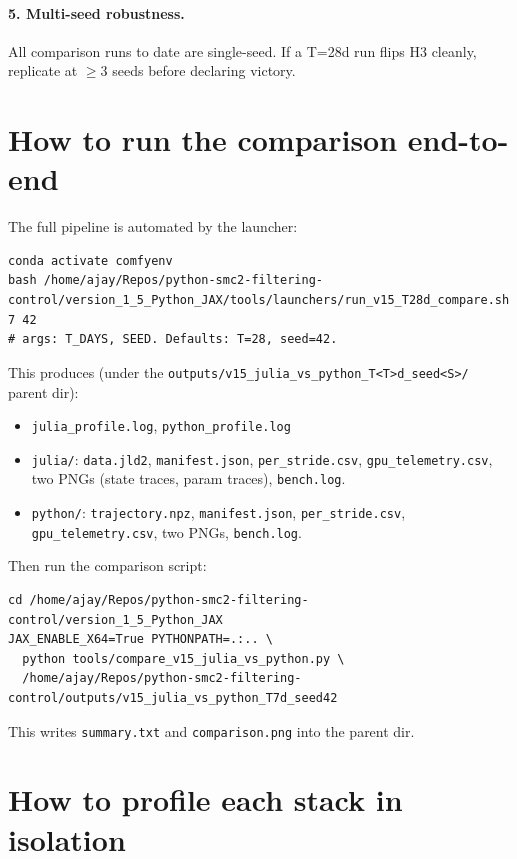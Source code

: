 \documentclass[11pt,a4paper]{article}
\begin{document}
\paragraph{5. Multi-seed robustness.}
All comparison runs to date are single-seed. If a T=28d run flips
H3 cleanly, replicate at $\geq 3$ seeds before declaring victory.

\section{How to run the comparison end-to-end}

The full pipeline is automated by the launcher:

\begin{lstlisting}
conda activate comfyenv
bash /home/ajay/Repos/python-smc2-filtering-control/version_1_5_Python_JAX/tools/launchers/run_v15_T28d_compare.sh 7 42
# args: T_DAYS, SEED. Defaults: T=28, seed=42.
\end{lstlisting}

This produces (under the \texttt{outputs/v15\_julia\_vs\_python\_T<T>d\_seed<S>/}
parent dir):

\begin{itemize}[itemsep=2pt]
  \item \texttt{julia\_profile.log}, \texttt{python\_profile.log}
  \item \texttt{julia/}: \texttt{data.jld2},
        \texttt{manifest.json}, \texttt{per\_stride.csv},
        \texttt{gpu\_telemetry.csv}, two PNGs (state traces, param
        traces), \texttt{bench.log}.
  \item \texttt{python/}: \texttt{trajectory.npz},
        \texttt{manifest.json}, \texttt{per\_stride.csv},
        \texttt{gpu\_telemetry.csv}, two PNGs, \texttt{bench.log}.
\end{itemize}

Then run the comparison script:

\begin{lstlisting}
cd /home/ajay/Repos/python-smc2-filtering-control/version_1_5_Python_JAX
JAX_ENABLE_X64=True PYTHONPATH=.:.. \
  python tools/compare_v15_julia_vs_python.py \
  /home/ajay/Repos/python-smc2-filtering-control/outputs/v15_julia_vs_python_T7d_seed42
\end{lstlisting}

This writes \texttt{summary.txt} and \texttt{comparison.png} into
the parent dir.

\section{How to profile each stack in isolation}
\end{document}
